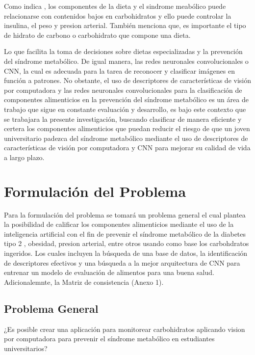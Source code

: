 Como indica \parencite{albornoz2012nutricion} , los componentes de la dieta y el sindrome meabólico puede relacionarse con contenidos bajos en carbohidratos y ello puede controlar la insulina, el peso y presion arterial. También menciona que, es importante el tipo de hidrato de carbono o carbohidrato que compone una dieta. 

Lo que facilita la toma de decisiones sobre dietas especializadas y la prevención del síndrome metabólico. De igual manera, las redes neuronales convolucionales o CNN, la cual es adecuada para la tarea de reconocer y clasificar imágenes en función a patrones. No obstante, el uso de descriptores de características de visión por computadora y las redes neuronales convolucionales para la clasificación de componentes alimenticios en la prevención del síndrome metabólico es un área de trabajo que sigue en constante evaluación y desarrollo, es bajo este contexto que se trabajara la presente investigación, buscando clasificar de manera eficiente y certera los componentes alimenticios que puedan reducir el riesgo de que un joven universitario padezca del síndrome metabólico mediante el uso de descriptores de características de visión por computadora y CNN para mejorar su calidad de vida a largo plazo.


\section{Formulación del Problema}

Para la formulación del problema se tomará un problema general el cual plantea la posibilidad de calificar los componentes alimenticios mediante el uso de la inteligencia artificial con el fin de prevenir el síndrome metabólico de la diabetes tipo 2 , obesidad, presion arterial, entre otros usando como base los carbohdratos ingeridos. Los cuales incluyen la búsqueda de una base de datos, la identificación de descriptores efectivos y una búsqueda a la mejor arquitectura de CNN para entrenar un modelo de evaluación de alimentos para una buena salud. Adicionalemnte, la Matriz de consistencia (Anexo 1). 

\subsection{Problema General}
\newcommand{\ProblemaGeneral}{
	¿Es posible crear una aplicación para monitorear carbohidratos aplicando vision por computadora para prevenir el síndrome metabólico en estudiantes universitarios?
}
\ProblemaGeneral
